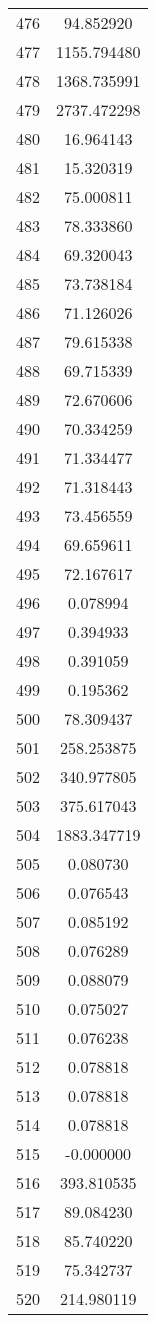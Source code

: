 \documentclass[12pt]{article}
\begin{document}
\begin{longtable}{@{}cc@{}}
476 & 94.852920 \\
477 & 1155.794480 \\
478 & 1368.735991 \\
479 & 2737.472298 \\
480 & 16.964143 \\
481 & 15.320319 \\
482 & 75.000811 \\
483 & 78.333860 \\
484 & 69.320043 \\
485 & 73.738184 \\
486 & 71.126026 \\
487 & 79.615338 \\
488 & 69.715339 \\
489 & 72.670606 \\
490 & 70.334259 \\
491 & 71.334477 \\
492 & 71.318443 \\
493 & 73.456559 \\
494 & 69.659611 \\
495 & 72.167617 \\
496 & 0.078994 \\
497 & 0.394933 \\
498 & 0.391059 \\
499 & 0.195362 \\
500 & 78.309437 \\
501 & 258.253875 \\
502 & 340.977805 \\
503 & 375.617043 \\
504 & 1883.347719 \\
505 & 0.080730 \\
506 & 0.076543 \\
507 & 0.085192 \\
508 & 0.076289 \\
509 & 0.088079 \\
510 & 0.075027 \\
511 & 0.076238 \\
512 & 0.078818 \\
513 & 0.078818 \\
514 & 0.078818 \\
515 & -0.000000 \\
516 & 393.810535 \\
517 & 89.084230 \\
518 & 85.740220 \\
519 & 75.342737 \\
520 & 214.980119 \\

\end{longtable}
\end{document}
